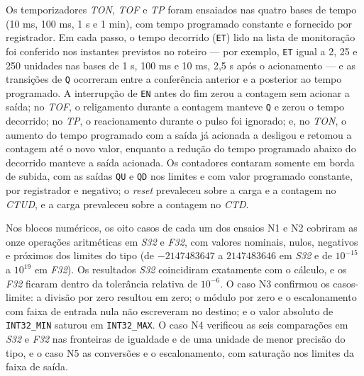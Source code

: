 Os temporizadores \textit{TON}, \textit{TOF} e \textit{TP} foram ensaiados nas quatro bases de tempo (10 ms, 100 ms, 1 s e 1 min), com tempo programado constante e fornecido por registrador.
Em cada passo, o tempo decorrido (\texttt{ET}) lido na lista de monitoração foi conferido nos instantes previstos no roteiro --- por exemplo, \texttt{ET} igual a 2, 25 e 250 unidades nas bases de 1 s, 100 ms e 10 ms, 2,5 s após o acionamento --- e as transições de \texttt{Q} ocorreram entre a conferência anterior e a posterior ao tempo programado.
A interrupção de \texttt{EN} antes do fim zerou a contagem sem acionar a saída; no \textit{TOF}, o religamento durante a contagem manteve \texttt{Q} e zerou o tempo decorrido; no \textit{TP}, o reacionamento durante o pulso foi ignorado; e, no \textit{TON}, o aumento do tempo programado com a saída já acionada a desligou e retomou a contagem até o novo valor, enquanto a redução do tempo programado abaixo do decorrido manteve a saída acionada.
Os contadores contaram somente em borda de subida, com as saídas \texttt{QU} e \texttt{QD} nos limites e com valor programado constante, por registrador e negativo; o \textit{reset} prevaleceu sobre a carga e a contagem no \textit{CTUD}, e a carga prevaleceu sobre a contagem no \textit{CTD}.

Nos blocos numéricos, os oito casos de cada um dos ensaios N1 e N2 cobriram as onze operações aritméticas em \textit{S32} e \textit{F32}, com valores nominais, nulos, negativos e próximos dos limites do tipo (de $-2147483647$ a $2147483646$ em \textit{S32} e de $10^{-15}$ a $10^{19}$ em \textit{F32}).
Os resultados \textit{S32} coincidiram exatamente com o cálculo, e os \textit{F32} ficaram dentro da tolerância relativa de $10^{-6}$.
O caso N3 confirmou os casos-limite: a divisão por zero resultou em zero; o módulo por zero e o escalonamento com faixa de entrada nula não escreveram no destino; e o valor absoluto de \texttt{INT32\_MIN} saturou em \texttt{INT32\_MAX}.
O caso N4 verificou as seis comparações em \textit{S32} e \textit{F32} nas fronteiras de igualdade e de uma unidade de menor precisão do tipo, e o caso N5 as conversões e o escalonamento, com saturação nos limites da faixa de saída.

